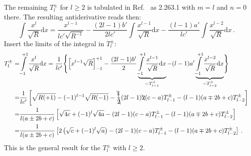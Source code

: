 The remaining $T^{\pm}_l$ for $l \ge 2$ is tabulated in Ref.~\cite{gradshteyn_ryzhik} as 2.263.1 with $m=l$ and $n=0$ there.
The resulting antiderivative reads then:
\begin{equation}
 \int \frac{x^l}{\sqrt{R}} \mathrm{d}x
 = \frac{x^{l-1}}{l c' \sqrt{R^{-1}}} - \frac{(2 l - 1)b'}{2 l c'} \int \frac{x^{l-1}}{\sqrt{R}} \mathrm{d}x - \frac{(l-1)a'}{l c'} \int \frac{x^{l-2}}{\sqrt{R}} \mathrm{d}x \, .
\end{equation}
Insert the limits of the integral in $T^{\pm}_l$:
\begin{align}
 T^{\pm}_l
 =& \int\limits_{-1}^{+1} \frac{x^l}{\sqrt{R}} \mathrm{d}x
 = \frac{1}{l c'} \Biggl\{
       \left[ x^{l-1} \sqrt{R} \right]_{-1}^{+1}
     - \frac{(2 l - 1)b'}{2} \underbrace{\int\limits_{-1}^{+1} \frac{x^{l-1}}{\sqrt{R}} \mathrm{d}x}_{=T^{\pm}_{l-1}}
     -   (l-1) a'            \underbrace{\int\limits_{-1}^{+1} \frac{x^{l-2}}{\sqrt{R}} \mathrm{d}x}_{=T^{\pm}_{l-2}}
   \Biggr\} \nonumber \\
 =& \frac{1}{l c'}
    \left[
      \sqrt{R(+1)} -(-1)^{l-1} \sqrt{R(-1)}
      - \bcancel{\frac{1}{2}} (2 l - 1) \bcancel{2} (c-a) T^{\pm}_{l-1}
      - (l-1) (a \mp 2 b + c) T^{\pm}_{l-2}
    \right] \nonumber \\
 =& \frac{1}{l (a \pm 2b + c)}
    \left[
      \sqrt{4 c} +(-1)^l \sqrt{4 a}
      - (2 l - 1) (c-a) T^{\pm}_{l-1}
      - (l-1) (a \mp 2 b + c) T^{\pm}_{l-2}
    \right] \nonumber \\
 =& \frac{1}{l (a \pm 2b + c)}
    \left[
      2 \left( \sqrt{c} +(-1)^l \sqrt{a} \right)
      - (2 l - 1) (c-a) T^{\pm}_{l-1}
      - (l-1) (a \mp 2 b + c) T^{\pm}_{l-2}
    \right] \, .
\end{align}
This is the general result for the $T^{\pm}_l$ with $l \ge 2$.

